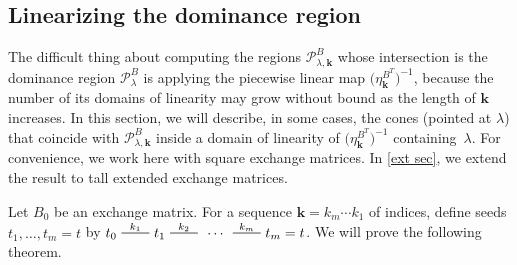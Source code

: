 \documentclass{amsart}
\newtheorem{theorem}[proposition]{Theorem}
\theoremstyle{definition}
\theoremstyle{remark}
\numberwithin{equation}{section}
\newcommand{\edge}{\,\,\rule[2.7pt]{20pt}{0.5pt}\,\,}
\newcommand{\set}[1]{{\left\lbrace #1 \right\rbrace}}
\newcommand{\0}{{\mathbf{0}}}
\newcommand{\Cone}{\mathrm{Cone}}
\newcommand{\g}{\mathbf{g}}
\newcommand{\kk}{\mathbf{k}}
\renewcommand{\P}{\mathcal{P}}
\begin{document}
\subsection{Linearizing the dominance region}\label{lin sec}
The difficult thing about computing the regions $\P^B_{\lambda,\kk}$ whose intersection is the dominance region $\P^B_\lambda$ is applying the piecewise linear map $\bigl(\eta^{B^T}_\kk\bigr)^{-1}$, because the number of its domains of linearity may grow without bound as the length of $\kk$ increases.
In this section, we will describe, in some cases, the cones (pointed at $\lambda$) that coincide with $\P^B_{\lambda,\kk}$ inside a domain of linearity of $\bigl(\eta^{B^T}_\kk\bigr)^{-1}$ containing~$\lambda$.
For convenience, we work here with square exchange matrices.
In \cref{ext sec}, we extend the result to tall extended exchange matrices.

Let $B_0$ be an exchange matrix.
For a sequence $\kk=k_m\cdots k_1$ of indices, define seeds $t_1,\ldots,t_m=t$ by $t_0\overset{k_1}{\edge}t_1\overset{k_2}{\edge}\,\cdots\,\overset{k_m}{\edge}t_m=t$.
We will prove the following theorem.
%
%
%
%
%
%
%
%
%
%
\end{document}
